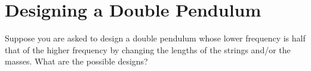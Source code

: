 \documentclass[11pt]{article}
\newenvironment{statement}
{
    \color{darkgray}
    \ignorespaces
}
{
}
\renewcommand{\vec}[1]{\mathbf{#1}}
\begin{document}
\newcommand{\thq}{\theta_1}
\newcommand{\thw}{\theta_2}
\newcommand{\thdq}{\dot{\theta}_1}
\newcommand{\thdw}{\dot{\theta}_2}
\newcommand{\thddq}{\ddot{\theta}_1}
\newcommand{\thddw}{\ddot{\theta}_2}

\newcommand{\vrq}{\vec{r}_1}
\newcommand{\vrw}{\vec{r}_2}
\newcommand{\xdq}{\dot{x}_1}
\newcommand{\xdw}{\dot{x}_2}
\newcommand{\yq}{y_1}
\newcommand{\yw}{y_2}
\newcommand{\ydq}{\dot{y}_1}
\newcommand{\ydw}{\dot{y}_2}

\newcommand{\Lh}{\hat{L}}
\newcommand{\vth}{\boldsymbol{\theta}}

\section{Designing a Double Pendulum} \label{prob2}
\begin{statement}
	Suppose you are asked to design a double pendulum whose lower frequency is half that of the higher frequency by changing the lengths of the strings and/or the masses.  What are the possible designs?
\end{statement}
\end{document}
